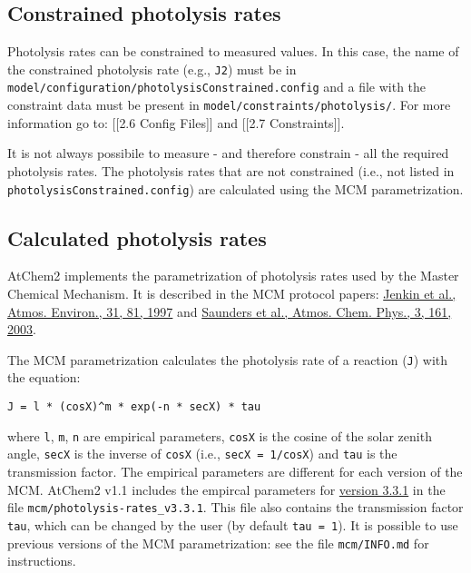 \hypertarget{constrained-photolysis-rates}{%
\subsection{Constrained photolysis
rates}\label{constrained-photolysis-rates}}

Photolysis rates can be constrained to measured values. In this case,
the name of the constrained photolysis rate (e.g., \texttt{J2}) must be
in \texttt{model/configuration/photolysisConstrained.config} and a file
with the constraint data must be present in
\texttt{model/constraints/photolysis/}. For more information go to:
{[}{[}2.6 Config Files{]}{]} and {[}{[}2.7 Constraints{]}{]}.

It is not always possibile to measure - and therefore constrain - all
the required photolysis rates. The photolysis rates that are not
constrained (i.e., not listed in \texttt{photolysisConstrained.config})
are calculated using the MCM parametrization.

\hypertarget{calculated-photolysis-rates}{%
\subsection{Calculated photolysis
rates}\label{calculated-photolysis-rates}}

AtChem2 implements the parametrization of photolysis rates used by the
Master Chemical Mechanism. It is described in the MCM protocol papers:
\href{https://doi.org/10.1016/S1352-2310(96)00105-7}{Jenkin et al.,
Atmos. Environ., 31, 81, 1997} and
\href{https://doi.org/10.5194/acp-3-161-2003}{Saunders et al., Atmos.
Chem. Phys., 3, 161, 2003}.

The MCM parametrization calculates the photolysis rate of a reaction
(\texttt{J}) with the equation:

\begin{verbatim}
J = l * (cosX)^m * exp(-n * secX) * tau
\end{verbatim}

where \texttt{l}, \texttt{m}, \texttt{n} are empirical parameters,
\texttt{cosX} is the cosine of the solar zenith angle, \texttt{secX} is
the inverse of \texttt{cosX} (i.e., \texttt{secX\ =\ 1/cosX}) and
\texttt{tau} is the transmission factor. The empirical parameters are
different for each version of the MCM. AtChem2 v1.1 includes the
empircal parameters for
\href{http://mcm.leeds.ac.uk/MCM/parameters/photolysis_param.htt}{version
3.3.1} in the file \texttt{mcm/photolysis-rates\_v3.3.1}. This file also
contains the transmission factor \texttt{tau}, which can be changed by
the user (by default \texttt{tau\ =\ 1}). It is possible to use previous
versions of the MCM parametrization: see the file \texttt{mcm/INFO.md}
for instructions.

